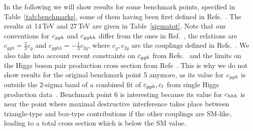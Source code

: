 
In the following we will show results for some benchmark points, specified in Table~\ref{tab:benchmarks}, 
some of them having been first defined in Refs.~\cite{Carvalho:2015ttv}.
The results at 14\,TeV and 27\,TeV are given in Table~\ref{sigmatot}.
Note that our conventions for $c_{ggh}$ and $c_{gghh}$ differ from the ones in
Ref.~\cite{Carvalho:2015ttv,Carvalho:2016rys}, the relations are $c_{ggh}= \frac{2}{3}c_g $
and $c_{gghh}=-\frac{1}{3}c_{2g}$, where $c_g,c_{2g}$ are the
couplings defined in Refs.~\cite{Carvalho:2015ttv,Carvalho:2016rys}.
We also take into account recent constraints on $c_{ggh}$ from
Refs.~\cite{CMS-PAS-HIG-17-031,deBlas:2018tjm}
and the  limits on the Higgs boson pair production cross section
from Refs~\cite{CMS-PAS-HIG-17-030,ATLAS-CONF-2018-043}.
This is why we do not show results for the original benchmark point 5
anymore, as its value for $c_{ggh}$ is outside the 2-sigma band of a
combined fit of $c_{ggh},c_{t}$ from single Higgs production
data~\cite{CMS-PAS-HIG-17-031,deBlas:2018tjm}.
Benchmark point 6 is interesting because its value for $c_{hhh}$ is near
the point where maximal destructive interference takes place between
triangle-type and box-type contributions if the other couplings are SM-like, leading to a total cross
section which is below the SM value.

